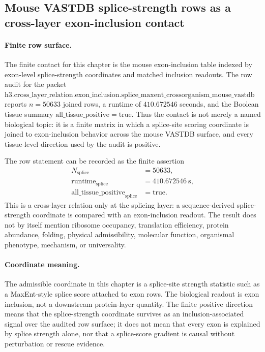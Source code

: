\subsection{Mouse VASTDB splice-strength rows as a cross-layer exon-inclusion contact}\label{subsec:bioreality-splice-maxent-mouse-vastdb}

\paragraph{Finite row surface.}
The finite contact for this chapter is the mouse exon-inclusion table indexed by exon-level splice-strength coordinates and matched inclusion readouts.  The row audit for the packet
$\mathrm{h3.cross\_layer\_relation.exon\_inclusion.splice\_maxent\_crossorganism\_mouse\_vastdb}$ reports $n=50633$ joined rows, a runtime of $410.672546$ seconds, and the Boolean tissue summary $\mathrm{all\_tissue\_positive}=\mathrm{true}$.  Thus the contact is not merely a named biological topic: it is a finite matrix in which a splice-site scoring coordinate is joined to exon-inclusion behavior across the mouse VASTDB surface, and every tissue-level direction used by the audit is positive.

The row statement can be recorded as the finite assertion
$$
\begin{aligned}
N_{\mathrm{splice}} &= 50633,\\
\mathrm{runtime}_{\mathrm{splice}} &= 410.672546\ \mathrm{s},\\
\mathrm{all\_tissue\_positive}_{\mathrm{splice}} &= \mathrm{true}.
\end{aligned}
$$
This is a cross-layer relation only at the splicing layer: a sequence-derived splice-strength coordinate is compared with an exon-inclusion readout.  The result does not by itself mention ribosome occupancy, translation efficiency, protein abundance, folding, physical admissibility, molecular function, organismal phenotype, mechanism, or universality.

\paragraph{Coordinate meaning.}
The admissible coordinate in this chapter is a splice-site strength statistic such as a MaxEnt-style splice score attached to exon rows.  The biological readout is exon inclusion, not a downstream protein-layer quantity.  The finite positive direction means that the splice-strength coordinate survives as an inclusion-associated signal over the audited row surface; it does not mean that every exon is explained by splice strength alone, nor that a splice-score gradient is causal without perturbation or rescue evidence.


